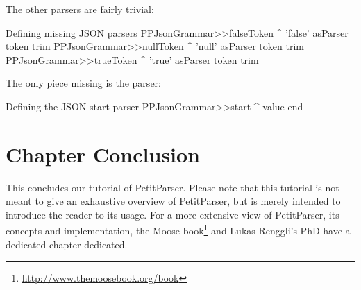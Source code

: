 \documentclass[a4paper,10pt,twoside]{book}
\begin{document}
The other parsers are fairly trivial:

\begin{script}{Defining missing JSON parsers}
PPJsonGrammar>>falseToken
  ^ 'false' asParser token trim
PPJsonGrammar>>nullToken
  ^ 'null' asParser token trim
PPJsonGrammar>>trueToken
  ^ 'true' asParser token trim
\end{script}

The only piece missing is the  parser:

\begin{script}{Defining the JSON start parser}
PPJsonGrammar>>start
  ^ value end
\end{script}

\section{Chapter Conclusion}

This concludes our tutorial of PetitParser. Please note that this
tutorial is not meant to give an exhaustive overview of PetitParser,
but is merely intended to introduce the reader to its usage. For a
more extensive view of PetitParser, its concepts and implementation,
the Moose book\footnote{\url{http://www.themoosebook.org/book}} and
Lukas Renggli's PhD have a dedicated chapter dedicated.

\ifx\wholebook\relax\else

\label{cha:glamour}


\end{document}
